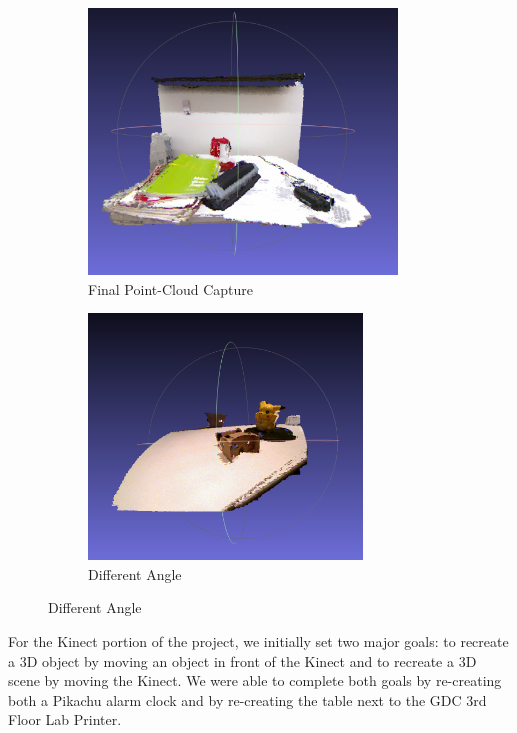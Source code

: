 \documentclass[11pt,oneside,english]{article}
\begin{document}
\begin{figure}[h]
\begin{subfigure}[b]{0.45\textwidth}
    \includegraphics[width=0.9\textwidth]{desk1}
    \caption{Final Point-Cloud Capture}
    \label{fig:awesome_image}
  \end{subfigure}
  \begin{subfigure}[b]{0.45\textwidth}
    \includegraphics[width=0.8\textwidth]{desk2}
    \caption{Different Angle}
    \label{fig:awesome_image}
  \end{subfigure}
\end{figure}

For the Kinect portion of the project, we initially set two major goals: to
recreate a 3D object by moving an object in front of the Kinect and to recreate
a 3D scene by moving the Kinect. We were able to complete both goals by
re-creating both a Pikachu alarm clock and by re-creating the table next to the
GDC 3rd Floor Lab Printer.
\end{document}
